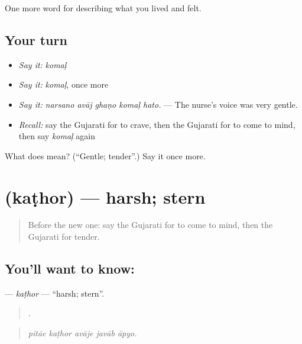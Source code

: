 \begin{grammarlens}[title={What you've built}]
One more word for describing what you lived and felt.
\end{grammarlens}

\subsection*{Your turn}
\begin{itemize}
\raggedright
  \item \emph{Say it:} \emph{komaḷ}
  \item \emph{Say it:} \emph{komaḷ}, once more
  \item \emph{Say it:} \emph{narsano avāj ghaṇo komaḷ hato.} — The nurse's voice was very gentle.
  \item \emph{Recall:} say the Gujarati for to crave, then the Gujarati for to come to mind, then say \emph{komaḷ} again
\end{itemize}

\begin{tcolorbox}[breakable,colback=teal!4,colframe=teal!35!black,title={Before you move on}]
What does  mean? (\textquotedblleft{}Gentle; tender\textquotedblright{}.) Say it once more.
\end{tcolorbox}
\section[\texorpdfstring{\gu{કઠોર} (kaṭhor)}{કઠોર (kaṭhor)}]{ (kaṭhor) — harsh; stern}

\label{lesson:GU-C459-kathor}



\begin{quote}
Before the new one: say the Gujarati for to come to mind, then the Gujarati for tender.
\end{quote}

\subsection*{You'll want to know: }
\textbf{} — \emph{kaṭhor} — \textquotedblleft{}harsh; stern\textquotedblright{}.

\begin{quote}
    .
\end{quote}

\begin{quote}
\emph{pitāe kaṭhor avāje javāb āpyo.}
\end{quote}

